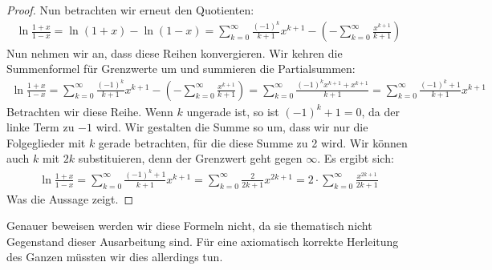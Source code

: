 \documentclass[10pt,fleqn]{article}
\theoremstyle{definition}
\theoremstyle{remark}
\begin{document}
\begin{proof}
    Nun betrachten wir erneut den Quotienten:
    \begin{align*}
        \ln{\frac{1+x}{1-x}} = \ln{(1+x)} - \ln{(1-x)} = \sum_{k=0}^{\infty} \frac{(-1)^{k}}{k+1} x^{k+1} - \left(-\sum_{k=0}^{\infty} \frac{x^{k+1}}{k+1}\right)
    \end{align*}
    Nun nehmen wir an, dass diese Reihen konvergieren. Wir kehren die Summenformel für Grenzwerte um und summieren die Partialsummen:
    \begin{align*}
        \ln{\frac{1+x}{1-x}} = \sum_{k=0}^{\infty} \frac{(-1)^{k}}{k+1} x^{k+1} - \left(-\sum_{k=0}^{\infty} \frac{x^{k+1}}{k+1}\right) = \sum_{k=0}^{\infty} \frac{(-1)^{k} x^{k+1} + x^{k+1}}{k+1} = \sum_{k=0}^{\infty} \frac{(-1)^{k} + 1}{k+1} x^{k+1}
    \end{align*}
    Betrachten wir diese Reihe. Wenn \(k\) ungerade ist, so ist \((-1)^k + 1 = 0\), da der linke Term zu \(-1\) wird. Wir gestalten die Summe so um, dass wir nur die Folgeglieder mit \(k\) gerade betrachten, für die diese Summe zu 2 wird. Wir können auch \(k\) mit \(2k\) substituieren, denn der Grenzwert geht gegen \(\infty\). Es ergibt sich:
    \begin{align*}
        \ln{\frac{1+x}{1-x}} = \sum_{k=0}^{\infty} \frac{(-1)^{k} + 1}{k+1} x^{k+1} = \sum_{k=0}^{\infty} \frac{2}{2k+1} x^{2k+1} = 2 \cdot \sum_{k=0}^{\infty} \frac{x^{2k+1}}{2k+1}
    \end{align*}
    Was die Aussage zeigt.
\end{proof}

Genauer beweisen werden wir diese Formeln nicht, da sie thematisch nicht Gegenstand dieser Ausarbeitung sind. Für eine axiomatisch korrekte Herleitung des Ganzen müssten wir dies allerdings tun.
\end{document}
